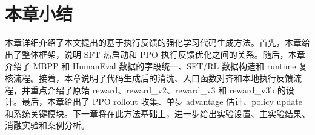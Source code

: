 \section{本章小结}

本章详细介绍了本文提出的基于执行反馈的强化学习代码生成方法。首先，本章给出了整体框架，说明 SFT 热启动和 PPO 执行反馈优化之间的关系。随后，本章介绍了 MBPP 和 HumanEval 数据的字段统一、SFT/RL 数据构造和 runtime 复核流程。接着，本章说明了代码生成后的清洗、入口函数对齐和本地执行反馈流程，并重点介绍了原始 reward、reward\_v2、reward\_v3 和 reward\_v3b 的设计。最后，本章给出了 PPO rollout 收集、单步 advantage 估计、policy update 和系统关键模块。下一章将在此方法基础上，进一步给出实验设置、主实验结果、消融实验和案例分析。
